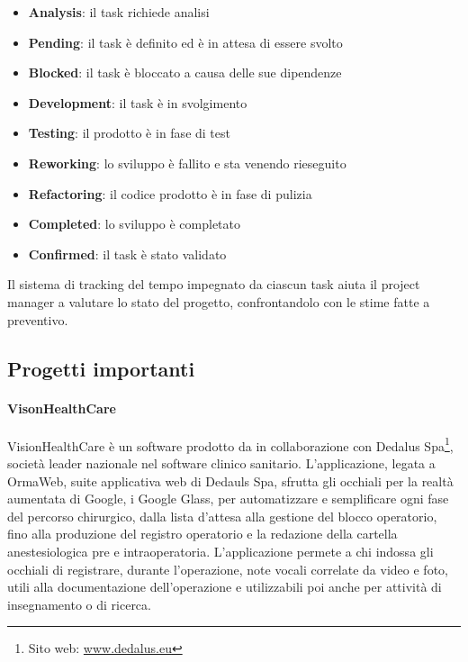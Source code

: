    \begin{itemize}
      \item{\textbf{Analysis}: il task richiede analisi}
      \item{\textbf{Pending}: il task è definito ed è in attesa di essere svolto}
      \item{\textbf{Blocked}: il task è bloccato a causa delle sue dipendenze}
      \item{\textbf{Development}: il task è in svolgimento}
      \item{\textbf{Testing}: il prodotto è in fase di test}
      \item{\textbf{Reworking}: lo sviluppo è fallito e sta venendo rieseguito}
      \item{\textbf{Refactoring}: il codice prodotto è in fase di pulizia}
      \item{\textbf{Completed}: lo sviluppo è completato}
      \item{\textbf{Confirmed}: il task è stato validato}
   \end{itemize}
   Il sistema di tracking del tempo impegnato da ciascun task aiuta il project manager a valutare lo stato del progetto, confrontandolo con le stime fatte a preventivo.

   \subsection{Progetti importanti}
   \paragraph{VisonHealthCare}
   VisionHealthCare è un software prodotto da \nomeAzienda{} in collaborazione con Dedalus Spa\footnote{Sito web: \href{www.dedalus.eu}{www.dedalus.eu}}, società leader nazionale nel software clinico sanitario. L'applicazione, legata a OrmaWeb, suite applicativa web di Dedauls Spa, sfrutta gli occhiali per la realtà aumentata di Google, i Google Glass, per automatizzare e semplificare ogni fase del percorso chirurgico, dalla lista d'attesa alla gestione del blocco operatorio, fino alla produzione del registro operatorio e la redazione della cartella anestesiologica pre e intraoperatoria. L'applicazione permete a chi indossa gli occhiali di registrare, durante l'operazione, note vocali correlate da video e foto, utili alla documentazione dell'operazione e utilizzabili poi anche per attività di insegnamento o di ricerca.

